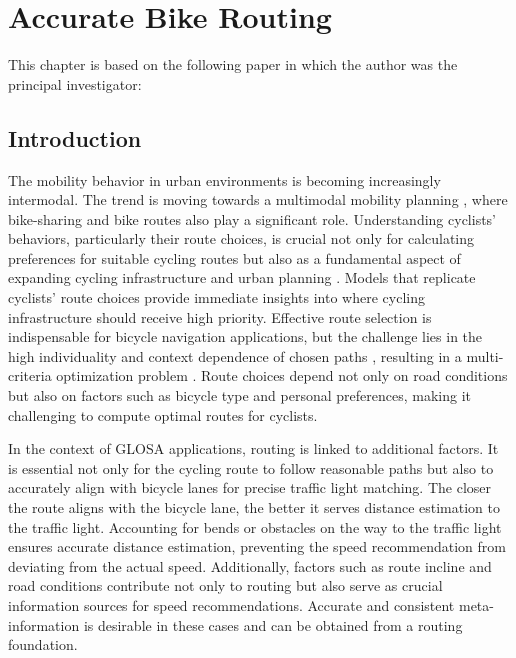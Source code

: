 \chapter{Accurate Bike Routing}\label{ch:routing}

\begin{Summary}
This chapter is based on the following paper in which the author was the principal investigator:

\cite{matthes2023accurate} 
\end{Summary}

\section{Introduction}

The mobility behavior in urban environments is becoming increasingly intermodal. The trend is moving towards a multimodal mobility planning \cite{park_framework_2023}, where bike-sharing and bike routes also play a significant role. Understanding cyclists' behaviors, particularly their route choices, is crucial not only for calculating preferences for suitable cycling routes but also as a fundamental aspect of expanding cycling infrastructure and urban planning \cite{zielstra_comparative_2011, huber_modelling_2021}. Models that replicate cyclists' route choices provide immediate insights into where cycling infrastructure should receive high priority. Effective route selection is indispensable for bicycle navigation applications, but the challenge lies in the high individuality and context dependence of chosen paths \cite{dill_revisiting_2016, schleinitz_german_2017, misra_modeling_2018}, resulting in a multi-criteria optimization problem \cite{song_exploring_2014}. Route choices depend not only on road conditions but also on factors such as bicycle type and personal preferences, making it challenging to compute optimal routes for cyclists.

In the context of GLOSA applications, routing is linked to additional factors. It is essential not only for the cycling route to follow reasonable paths but also to accurately align with bicycle lanes for precise traffic light matching. The closer the route aligns with the bicycle lane, the better it serves distance estimation to the traffic light. Accounting for bends or obstacles on the way to the traffic light ensures accurate distance estimation, preventing the speed recommendation from deviating from the actual speed. Additionally, factors such as route incline and road conditions contribute not only to routing but also serve as crucial information sources for speed recommendations. Accurate and consistent meta-information is desirable in these cases and can be obtained from a routing foundation.

